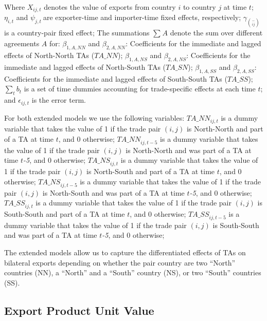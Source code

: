 \documentclass[12pt]{article}%
\begin{document}
Where \(X_{ij,t}\)\hspace{0pt} denotes the value of exports from country
\(i\) to country \(j\) at time \(t\); \(\eta_{i,t}\) and
\(\psi_{j,t}\ \)are exporter-time and importer-time fixed effects,
respectively; \(\gamma_{\binom{-}{ij}}\) is a country-pair fixed effect;
The summations \hspace{0pt}\(\sum_{}^{}A\) denote the sum over different
agreements \(A\) for: \(\beta_{1,A,NN}\) and \(\beta_{2,A,NN}\):
Coefficients for the immediate and lagged effects of North-North TAs
\hspace{0pt}(\(TA\_ NN\)); \(\beta_{1,A,NS}\) and \(\beta_{2,A,NS}\):
Coefficients for the immediate and lagged effects of North-South TAs
(\(TA\_ SN\)); \(\beta_{1,A,SS}\) and \(\beta_{2,A,SS}\): Coefficients
for the immediate and lagged effects of South-South TAs (\(TA\_ SS\));
\(\sum_{t}^{}b_{t}\) is a set of time dummies accounting for
trade-specific effects at each time \(t\); and \(\epsilon_{ij,t}\) is
the error term.

For both extended models we use the following variables:
\({TA\_ NN}_{ij,t}\) is a dummy variable that takes the value of 1 if
the trade pair \((i,j)\) is North-North and part of a TA at time \(t\),
and 0 otherwise; \({TA\_ NN}_{ij,t - 5}\) is a dummy variable that takes
the value of 1 if the trade pair \((i,j)\) is North-North and was part
of a TA at time \(t\)\emph{-5}, and 0 otherwise; \({TA\_ NS}_{ij,t}\) is
a dummy variable that takes the value of 1 if the trade pair \((i,j)\)
is North-South and part of a TA at time \(t\), and 0 otherwise;
\({TA\_ NS}_{ij,t - 5}\) is a dummy variable that takes the value of 1
if the trade pair \((i,j)\) is North-South and was part of a TA at time
\(t\)\emph{-5}, and 0 otherwise; \({TA\_ SS}_{ij,t}\) is a dummy
variable that takes the value of 1 if the trade pair \((i,j)\) is
South-South and part of a TA at time \(t\), and 0 otherwise;
\({TA\_ SS}_{ij,t - 5}\) is a dummy variable that takes the value of 1
if the trade pair \((i,j)\) is South-South and was part of a TA at time
\(t\)\emph{-5}, and 0 otherwise;

The extended models allow us to capture the differentiated effects of
TAs on bilateral exports depending on whether the pair country are two
``North'' countries (NN), a ``North'' and a ``South'' country (NS), or
two ``South'' countries (SS).

%
\subsection{Export Product Unit Value}%
\label{subsec:ExportProductUnitValue}%
\end{document}
